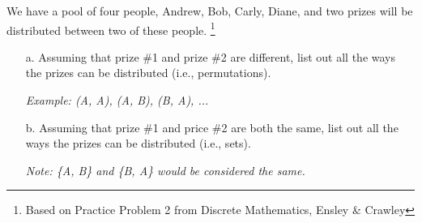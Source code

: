     \begin{questionNOGRADE}{\thequestion}

        We have a pool of four people, Andrew, Bob, Carly, Diane, and two prizes will be distributed
        between two of these people.
        \footnote{Based on Practice Problem 2 from Discrete Mathematics, Ensley \& Crawley}

        \begin{enumerate}
            \item[a.] Assuming that prize \#1 and prize \#2 are different, list out
            all the ways the prizes can be distributed (i.e., permutations).

            \textit{Example: (A, A), (A, B), (B, A), ...}

            \item[b.] Assuming that prize \#1 and price \#2 are both the same,
            list out all the ways the prizes can be distributed (i.e., sets).

            \textit{Note: \{A, B\} and \{B, A\} would be considered the same.}
        \end{enumerate}
        
    \end{questionNOGRADE}

    \newpage


